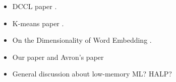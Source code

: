 \begin{itemize}
	\item DCCL paper \citep{dccl17}.
	\item K-means paper \citep{andrews16}.
	\item On the Dimensionality of Word Embedding \citep{yin18}.
	\item Our paper \citep{lprff18} and Avron's paper \citep{avron17}
	\item General discussion about low-memory ML? HALP?
\end{itemize}